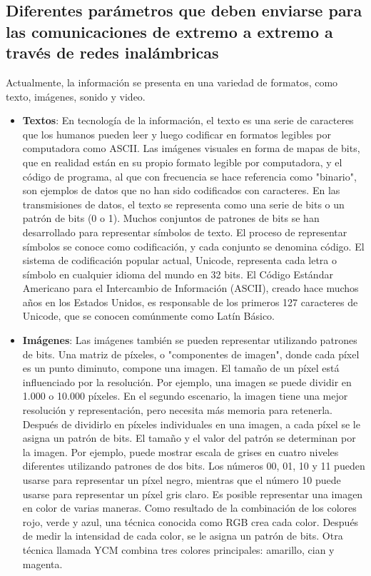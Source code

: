 \subsection{Diferentes parámetros que deben enviarse para las comunicaciones de extremo a extremo a través de redes inalámbricas }

Actualmente, la información se presenta en una variedad de formatos, como texto, imágenes, sonido y video.

\begin{itemize}
	\item \textbf{Textos}: En tecnología de la información, el texto es una serie de caracteres que los humanos pueden leer y luego codificar en formatos legibles por computadora como ASCII. Las imágenes visuales en forma de mapas de bits, que en realidad están en su propio formato legible por computadora, y el código de programa, al que con frecuencia se hace referencia como "binario", son ejemplos de datos que no han sido codificados con caracteres. En las transmisiones de datos, el texto se representa como una serie de bits o un patrón de bits (0 o 1). Muchos conjuntos de patrones de bits se han desarrollado para representar símbolos de texto. El proceso de representar símbolos se conoce como codificación, y cada conjunto se denomina código. El sistema de codificación popular actual, Unicode, representa cada letra o símbolo en cualquier idioma del mundo en 32 bits. El Código Estándar Americano para el Intercambio de Información (ASCII), creado hace muchos años en los Estados Unidos, es responsable de los primeros 127 caracteres de Unicode, que se conocen comúnmente como Latín Básico. \parencite{tec_marks2001standieee}
	\item \textbf{Imágenes}: Las imágenes también se pueden representar utilizando patrones de bits. Una matriz de píxeles, o "componentes de imagen", donde cada píxel es un punto diminuto, compone una imagen. El tamaño de un píxel está influenciado por la resolución. Por ejemplo, una imagen se puede dividir en 1.000 o 10.000 píxeles. En el segundo escenario, la imagen tiene una mejor resolución y representación, pero necesita más memoria para retenerla. Después de dividirlo en píxeles individuales en una imagen, a cada píxel se le asigna un patrón de bits. El tamaño y el valor del patrón se determinan por la imagen. Por ejemplo, puede mostrar escala de grises en cuatro niveles diferentes utilizando patrones de dos bits. Los números 00, 01, 10 y 11 pueden usarse para representar un píxel negro, mientras que el número 10 puede usarse para representar un píxel gris claro. Es posible representar una imagen en color de varias maneras. Como resultado de la combinación de los colores rojo, verde y azul, una técnica conocida como RGB crea cada color. Después de medir la intensidad de cada color, se le asigna un patrón de bits. Otra técnica llamada YCM combina tres colores principales: amarillo, cian y magenta. \parencite{tec_singh2011perfommobil}

\end{itemize}
